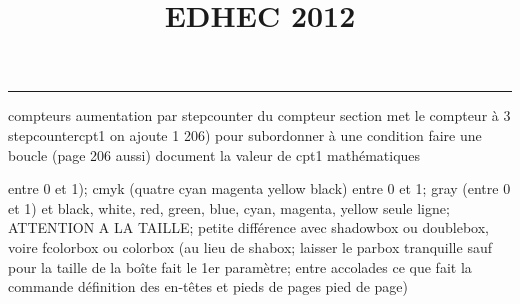 \documentclass[11pt]{article}%
\title{\bf \vspace{-2cm} EDHEC 2012} %
\author{} %
\date{} %
\renewcommand{\headrulewidth}{0pt}%
\renewcommand{\footrulewidth}{0.4pt}%
\begin{document}
\maketitle %
\vspace{-1.4cm}\hrule %
\thispagestyle{fancy}

\vspace*{.2cm}



compteurs%
aumentation par stepcounter du compteur section%
met le compteur à 3%
stepcounter{cpt1} on ajoute 1%
206) pour subordonner à une condition %
faire une boucle (page 206 aussi) %
document la valeur de cpt1 
mathématiques\newcommand{\ch}{\operatorname{ch}} 
\newcommand{\sh}{\operatorname{sh}}
\renewcommand{\tanh}{\operatorname{th}}
\renewcommand{\sinh}{\operatorname{sh}}
\renewcommand{\cosh}{\operatorname{ch}}
\newcommand{\argsh}{\operatorname{argsh}}
\newcommand{\argch}{\operatorname{argch}}
\newcommand{\argth}{\operatorname{argth}}
\newcommand{\ker}{\operatorname{Ker}}
\renewcommand{\im}{\operatorname{Im}}
\newcommand{\rg}{\operatorname{rg}}
\newcommand{\Id}{\operatorname{Id}}
\newcommand{\id}{\operatorname{id}}
\renewcommand{\leq}{\leq}
\renewcommand{\geq}{\geq }

entre 0 et 1); cmyk (quatre cyan magenta yellow black) entre 0 et 1;
gray (entre 0 et 1) et black, white, red, green, blue, cyan, magenta,
yellow%
seule ligne; ATTENTION A LA TAILLE; petite différence avec shadowbox ou
doublebox, voire fcolorbox ou colorbox (au lieu de shabox; laisser le
parbox tranquille sauf pour la taille de la boîte
\newcommand{\Tbox}[1]{\begin{center} \shabox{\parbox{0.6
\linewidth}{#1}} \end{center}} %
fait le 1er paramètre; entre accolades ce que fait la commande
définition des en-têtes et pieds de pages\pagestyle{fancy}
\chead{}
\rfoot[ \ \thepage]{\thepage}
\cfoot{}
\lfoot{}
\thispagestyle{fancy} %
pied de page)\renewcommand{\footrulewidth}{0.4pt}
\renewcommand{\headrulewidth}{0.4pt}
\end{document}
